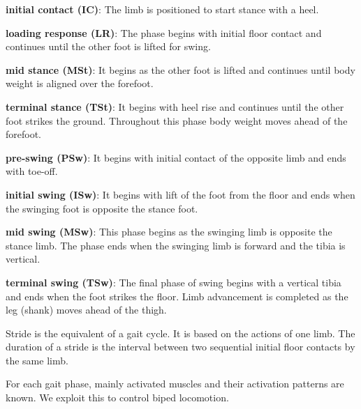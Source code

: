 \documentclass[master,english,final]{kaist-ucs}
\begin{document}
\begin{list}{}{\leftmargin=3em}
\setlength{\itemsep}{0cm}
\setlength{\parskip}{0cm}
\item {\bf initial contact (IC)}:
The limb is positioned to start stance with a heel.
\item {\bf loading response (LR)}:
The phase begins with initial floor contact and continues until the other foot is lifted for swing.
\item {\bf mid stance (MSt)}:
It begins as the other foot is lifted and continues until body weight is aligned over the forefoot.
\item {\bf terminal stance (TSt)}:
It begins with heel rise and continues until the other foot strikes the ground.
Throughout this phase body weight moves ahead of the forefoot.
\item {\bf pre-swing (PSw)}:
It begins with initial contact of the opposite limb and ends with toe-off.
\item {\bf initial swing (ISw)}:
It begins with lift of the foot from the floor and ends when the swinging foot is opposite the stance foot.
\item {\bf mid swing (MSw)}:
This phase begins as the swinging limb is opposite the stance limb.
The phase ends when the swinging limb is forward and the tibia is vertical.
\item {\bf terminal swing (TSw)}:
The final phase of swing begins with a vertical tibia and ends when the foot strikes the floor.
Limb advancement is completed as the leg (shank) moves ahead of the thigh.
\end{list}


Stride is the equivalent of a gait cycle. It is based on the actions of one limb.
The duration of a stride is the interval between two sequential initial floor contacts by the same limb.

For each gait phase, mainly activated muscles and their activation patterns are known.
We exploit this to control biped locomotion.
\end{document}
